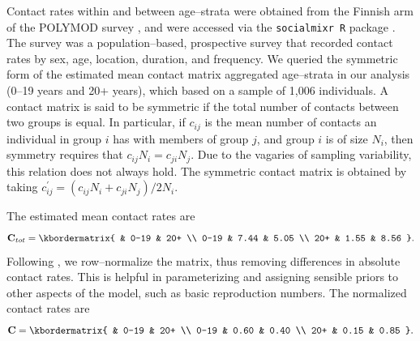 Contact rates within and between age--strata were obtained from the Finnish arm of the POLYMOD survey \cite{mossong2008social,polymod}, and were accessed via the \texttt{socialmixr R} package \cite{funk2018socialmixr}. The survey was a population--based, prospective survey that recorded contact rates by sex, age, location, duration, and frequency. We queried the symmetric form of the estimated mean contact matrix aggregated age--strata in our analysis (0--19 years and 20+ years), which based on a sample of 1,006 individuals. A contact matrix is said to be symmetric if the total number of contacts between two groups is equal. In particular, if $ c_{ij} $ is the mean number of contacts an individual in group $ i $ has with members of group $ j $, and group $ i $ is of size $ N_i $, then symmetry requires that $ c_{ij}N_i = c_{ji}N_j $. Due to the vagaries of sampling variability, this relation does not always hold. The symmetric contact matrix is obtained by taking $ c_{ij}^{\prime} = (c_{ij}N_i + c_{ji}N_j) / 2N_i $. 

The estimated mean contact rates are
\[ \bC_{tot} = 
\kbordermatrix{
	 & 0-19 & 20+ \\
	 0-19 & 7.44 & 5.05 \\
	 20+ & 1.55 & 8.56
}. \]
Following \cite{meyer2017incorporating}, we row--normalize the matrix, thus removing differences in absolute contact rates. This is helpful in parameterizing and assigning sensible priors to other aspects of the model, such as basic reproduction numbers. The normalized contact rates are
\[ \bC = 
\kbordermatrix{
	& 0-19 & 20+ \\
	0-19 & 0.60 & 0.40 \\
	20+ & 0.15 & 0.85
}. \]

\newpage
